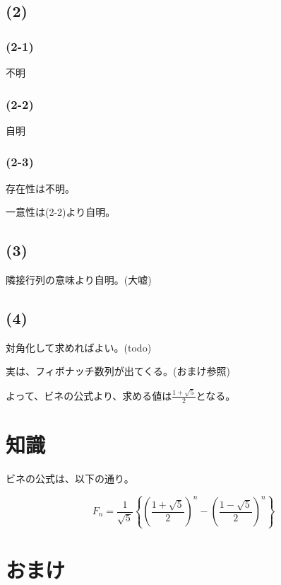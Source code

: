 \documentclass[a4paper, 10pt, dvipdfmx]{jlreq}
\begin{document}
\subsection*{(2)}

\subsubsection*{(2-1)}

不明

\subsubsection*{(2-2)}

自明

\subsubsection*{(2-3)}

存在性は不明。

一意性は(2-2)より自明。

\subsection*{(3)}

隣接行列の意味より自明。(大嘘)

\subsection*{(4)}

対角化して求めればよい。(todo)

実は、フィボナッチ数列が出てくる。(おまけ参照)

よって、ビネの公式より、求める値は$\frac{1+\sqrt{5}}{2}$となる。

\section{知識}

ビネの公式は、以下の通り。\cite{site:binet}

\begin{equation*}
  F_n=\frac{1}{\sqrt{5}}\left\{ \left( \frac{1+\sqrt{5}}{2} \right)^n - \left( \frac{1-\sqrt{5}}{2} \right)^n \right\}
\end{equation*}

\section{おまけ}
\end{document}
